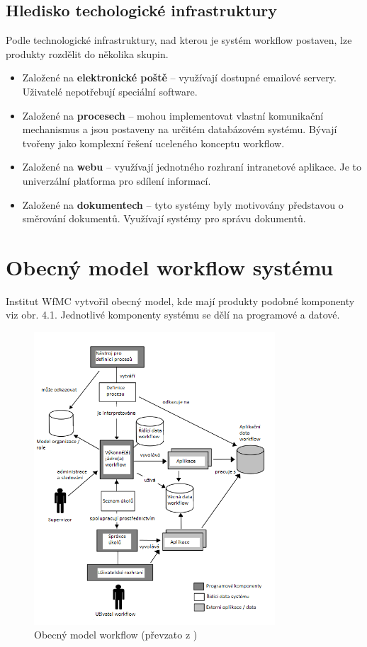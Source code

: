 \documentclass{fithesis}
\begin{document}
\subsection{Hledisko techologické infrastruktury}
Podle technologické infrastruktury, nad kterou je systém workflow postaven, lze produkty rozdělit do několika skupin.
\begin{itemize}
\item Založené na \textbf{elektronické poště} -- využívají dostupné emailové servery. Uživatelé nepotřebují speciální software.
\item Založené na \textbf{procesech} -- mohou implementovat vlastní komunikační mechanismus a jsou postaveny na určitém databázovém systému. Bývají tvořeny jako komplexní řešení uceleného konceptu workflow.
\item Založené na \textbf{webu} -- využívají jednotného rozhraní intranetové aplikace. Je to univerzální platforma pro sdílení informací.
\item Založené na \textbf{dokumentech} -- tyto systémy byly motivovány představou o směrování dokumentů. Využívají systémy pro správu dokumentů.
\end{itemize}

\section{Obecný model workflow systému}
Institut WfMC vytvořil obecný model, kde mají produkty podobné komponenty viz obr. 4.1. Jednotlivé komponenty systému se dělí na programové a datové.

\begin{figure}[htp]
\centering
\includegraphics[width=340px]{images/obecny_model.png}
\caption{Obecný model workflow (převzato z \cite{wfmc})}
\end{figure}
\end{document}

